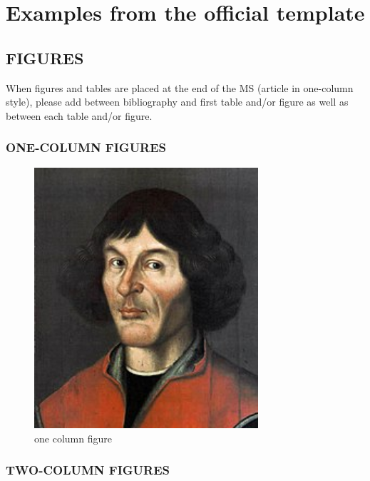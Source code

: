 \documentclass[gc, manuscript]{copernicus}
\begin{document}
\section{Examples from the official template}

\subsection{FIGURES}

When figures and tables are placed at the end of the MS (article in
one-column style), please add \clearpage between bibliography and first
table and/or figure as well as between each table and/or figure.

\subsubsection{ONE-COLUMN FIGURES}

\begin{figure}
\includegraphics[width=8.3cm]{Nikolaus_Kopernikus} \caption{one column figure}\label{fig:unnamed-chunk-4}
\end{figure}

\subsubsection{TWO-COLUMN FIGURES}
\end{document}
